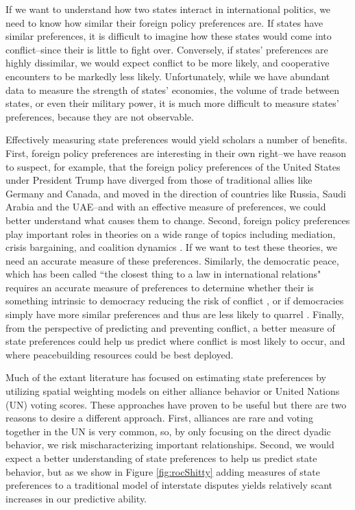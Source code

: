 If we want to understand how two states interact in international politics, we need to know how similar their foreign policy preferences are. If states have similar preferences, it is difficult to imagine how these states would come into conflict--since their is little to fight over. Conversely, if states' preferences are highly dissimilar, we would expect conflict to be more likely, and cooperative encounters to be markedly less likely. Unfortunately, while we have abundant data to measure the strength of states' economies, the volume of trade between states, or even their military power, it is much more difficult to measure states' preferences, because they are not observable.

Effectively measuring state preferences would yield scholars a number of benefits. First, foreign policy preferences are interesting in their own right--we have reason to suspect, for example, that the foreign policy preferences of the United States under President Trump have diverged from those of traditional allies like Germany and Canada, and moved in the direction of countries like Russia, Saudi Arabia and the UAE--and with an effective measure of preferences, we could better understand what causes them to change. Second, foreign policy preferences play important roles in theories on a wide range of topics including mediation, crisis bargaining, and coalition dynamics \citep{kydd:2003, gallop:2017, wolford:2014}. If we want to test these theories, we need an accurate measure of these preferences. Similarly, the democratic peace, which has been called ``the closest thing to a law in international relations" requires an accurate measure of preferences to determine whether their is something intrinsic to democracy reducing the risk of conflict \citep{oneal:russett:1999e}, or if democracies simply have more similar preferences and thus are less likely to quarrel \citep{farber:gowa:1995, gartzke:1998}. Finally, from the perspective of predicting and preventing conflict, a better measure of state preferences could help us predict where conflict is most likely to occur, and where peacebuilding resources could be best deployed.

Much of the extant literature has focused on estimating state preferences by utilizing spatial weighting models on either alliance behavior or United Nations (UN) voting scores. These approaches have proven to be useful but there are two reasons to desire a different approach. First, alliances are rare and voting together in the UN is very common, so, by only focusing on the direct dyadic behavior, we risk mischaracterizing important relationships. Second, we would expect a better understanding of state preferences to help us predict state behavior, but as we show in Figure \ref{fig:rocShitty} adding measures of state preferences to a traditional model of interstate disputes yields relatively scant increases in our predictive ability.

